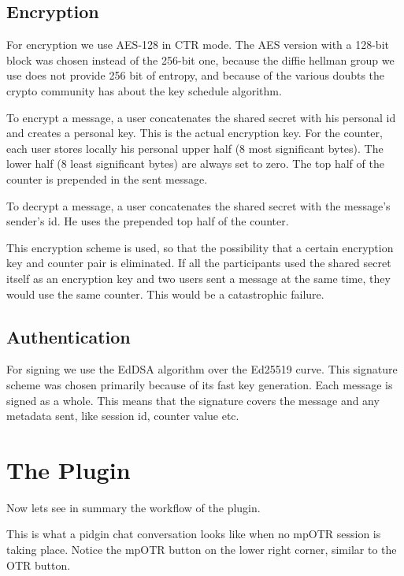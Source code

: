 \documentclass[]{article}
\begin{document}
\subsection{Encryption}
For encryption we use AES-128 in CTR mode.
The AES version with a 128-bit block was chosen instead of the 256-bit one, because the diffie hellman group we use does not provide 256 bit of entropy, and because of the various doubts the crypto community has about the key schedule algorithm.

To encrypt a message, a user concatenates the shared secret with his personal id and creates a personal key.
This is the actual encryption key.
For the counter, each user stores locally his personal upper half (8 most significant bytes).
The lower half (8 least significant bytes) are always set to zero.
The top half of the counter is prepended in the sent message.

To decrypt a message, a user concatenates the shared secret with the message's sender's id.
He uses the prepended top half of the counter.

This encryption scheme is used, so that the possibility that a certain encryption key and counter pair is eliminated.
If all the participants used the shared secret itself as an encryption key and two users sent a message at the same time, they would use the same counter.
This would be a catastrophic failure.

\subsection{Authentication}
For signing we use the EdDSA algorithm over the Ed25519 curve.
This signature scheme was chosen primarily because of its fast key generation.
Each message is signed as a whole.
This means that the signature covers the message and any metadata sent, like session id, counter value etc.

\clearpage
\section{The Plugin}
Now lets see in summary the workflow of the plugin.

This is what a pidgin chat conversation looks like when no mpOTR session is taking place.
Notice the mpOTR button on the lower right corner, similar to the OTR button.
\end{document}
